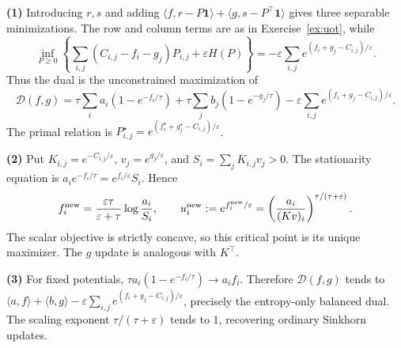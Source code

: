 \documentclass[11pt,a4paper]{article}
\theoremstyle{exostyle}
\begin{document}
\begin{solution}
\textbf{(1)} Introducing $r,s$ and adding $\langle f,r-P\mathbf1\rangle+\langle g,s-P^\top\mathbf1\rangle$ gives three separable minimizations. The row and column terms are as in Exercise~\ref{ex:uot}, while
\[
\inf_{P\ge0}\left\{\sum_{i,j}(C_{i,j}-f_i-g_j)P_{i,j}+\varepsilon H(P)\right\}
=-\varepsilon\sum_{i,j}e^{(f_i+g_j-C_{i,j})/\varepsilon}.
\]
Thus the dual is the unconstrained maximization of
\[
\mathcal D(f,g)=\tau\sum_i a_i(1-e^{-f_i/\tau})+
\tau\sum_j b_j(1-e^{-g_j/\tau})-
\varepsilon\sum_{i,j}e^{(f_i+g_j-C_{i,j})/\varepsilon}.
\]
The primal relation is $P_{i,j}^\star=e^{(f_i^\star+g_j^\star-C_{i,j})/\varepsilon}$.

\textbf{(2)} Put $K_{i,j}=e^{-C_{i,j}/\varepsilon}$, $v_j=e^{g_j/\varepsilon}$, and $S_i=\sum_jK_{i,j}v_j>0$. The stationarity equation is
$a_i e^{-f_i/\tau}=e^{f_i/\varepsilon}S_i$. Hence
\[
f_i^{\rm new}=\frac{\varepsilon\tau}{\varepsilon+\tau}\log\frac{a_i}{S_i},\qquad
u_i^{\rm new}:=e^{f_i^{\rm new}/\varepsilon}
=\left(\frac{a_i}{(Kv)_i}\right)^{\tau/(\tau+\varepsilon)}.
\]
The scalar objective is strictly concave, so this critical point is its unique maximizer. The $g$ update is analogous with $K^\top$.

\textbf{(3)} For fixed potentials, $\tau a_i(1-e^{-f_i/\tau})\to a_if_i$. Therefore $\mathcal D(f,g)$ tends to
$\langle a,f\rangle+\langle b,g\rangle-\varepsilon\sum_{i,j}e^{(f_i+g_j-C_{i,j})/\varepsilon}$, precisely the entropy-only balanced dual. The scaling exponent $\tau/(\tau+\varepsilon)$ tends to $1$, recovering ordinary Sinkhorn updates.
\end{solution}
\end{document}
